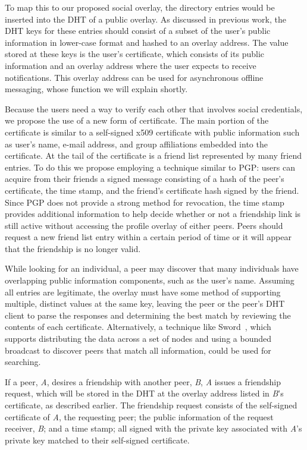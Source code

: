 To map this to our proposed social overlay, the directory entries would be
inserted into the DHT of a public overlay.  As discussed in previous work, the
DHT keys for these entries should consist of a subset of the user's
public information in lower-case format and hashed to an overlay  address.  The
value stored at these keys is the user's certificate, which consists of its public
information and an overlay address where the user expects to receive
notifications.  This overlay address can be used for asynchronous offline
messaging, whose function we will explain shortly.

Because the users need a way to verify each other that involves social credentials,
we propose the use of a new form of certificate.
The main portion of the certificate is similar to a self-signed
x509 certificate with public information such as user's name, e-mail
address, and group affiliations embedded into the certificate.  At the tail of
the certificate is a friend list represented by many friend entries.  To do this
we propose employing a technique similar to PGP: users can acquire from their
friends a signed message consisting of a hash of the peer's certificate, the
time stamp, and the friend's certificate hash signed by the friend.  Since PGP
does not provide a strong method for revocation, the time stamp provides
additional information to help decide whether or not a friendship link is still
active without accessing the profile overlay of either peers.  Peers should
request a new friend list entry within a certain period of time or it will
appear that the friendship is no longer valid.

While looking for an individual, a peer may discover that many individuals have
overlapping public information components, such as the user's name.  Assuming
all entries are legitimate, the overlay must have some method of supporting
multiple, distinct values at the same key, leaving the peer or the peer's DHT
client to parse the responses and determining the best match by reviewing the
contents of each certificate.  Alternatively, a technique like
Sword~\cite{sword}, which supports distributing the data across a set of nodes
and using a bounded broadcast to discover peers that match all information,
could be used for searching.

If a peer, \textit{A}, desires a friendship with another peer, \textit{B},
\textit{A} issues a friendship request, which will be stored in the DHT
at the overlay address listed in \textit{B}'s certificate, as described earlier.
The friendship request consists of the self-signed certificate of
\textit{A}, the requesting peer; the public information of the request receiver,
\textit{B}; and a time stamp; all signed with the private key associated with 
\textit{A}'s private key matched to their self-signed certificate.


